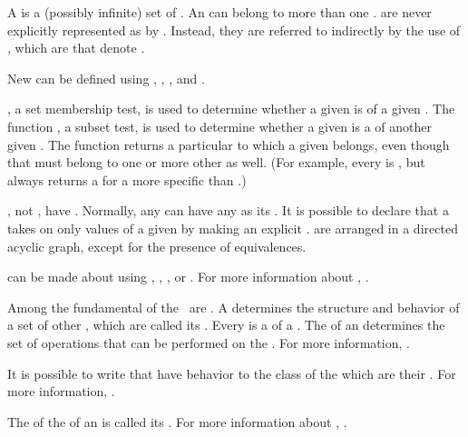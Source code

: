 
A  is a (possibly infinite) set of .
An  can belong to more than one .  
 are never explicitly represented as  by \clisp.
Instead, they are referred to indirectly by the use of ,
which are  that denote .

New  can be defined using , , 
, and .

, a set membership test, is used to determine
whether a given  is of a given .  The function
, a subset test, is used to determine whether a
given  is a  of another given .  The
function  returns a particular  to
which a given  belongs, even though that 
must belong to one or more other  as well.
(For example, every  is , 
 but  always returns a 
 for a  more specific than .)

, not , have .
Normally, any  can have any  as its .
It is possible to declare that a  takes on only 
values of a given  by making an explicit .
 are arranged in a directed acyclic graph, except
for the presence of equivalences. 

 can be made about  using , 
, , or .
For more information about ,
\seesection\Declarations.

Among the fundamental  of the \CLOS\ are .
A  determines the structure and behavior of a set of
other , which are called its . 
Every  is a  of a .
The  of an  determines the set of
operations that can be performed on the .
For more information, \seesection\Classes.

It is possible to write  that have behavior 
to the class of the  which are their .
For more information, \seesection\GFsAndMethods.

The  of the  of an  
is called its .
For more information about ,
\seesection\MetaObjects.
